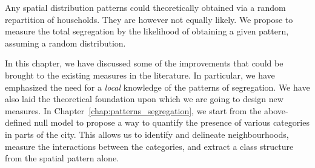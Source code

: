 Any spatial distribution patterns could theoretically obtained via a random
repartition of households. They are however not equally likely. We propose to
measure the total segregation by the likelihood of obtaining a given pattern,
assuming a random distribution.

\bigskip

In this chapter, we have discussed some of the improvements that could be
brought to the existing measures in the literature. In particular, we have
emphasized the need for a \emph{local} knowledge of the patterns of segregation.
We have also laid the theoretical foundation upon which we are going to design
new measures.
In Chapter~\ref{chap:patterns_segregation}, we start from the above-defined null
model to propose a way to quantify the presence of various categories in parts
of the city. This allows us to identify and delineate neighbourhoods, measure the interactions
between the categories, and extract a class structure from the spatial pattern
alone.
